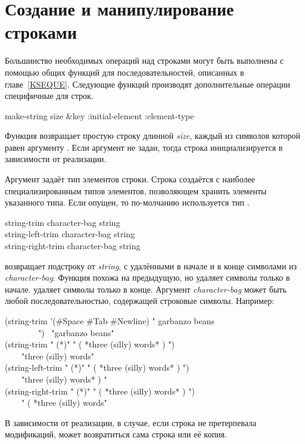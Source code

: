 \section{Создание и манипулирование строками}

Большинство необходимых операций над строками могут быть выполнены с помощью
общих функций для последовательностей, описанных в главе~\ref{KSEQUE}.
Следующие функций производят дополнительные операции специфичные для строк.

\begin{defun}[Функция]
make-string size &key :initial-element :element-type

Функция возвращает простую строку длинной \emph{size}, каждый из символов
которой равен аргументу .
Если аргумент  не задан, тогда строка инициализируется в
зависимости от реализации.

Аргумент  задаёт тип элементов строки. 
Строка создаётся с наиболее специализированным типов элементов, позволяющем
хранить элементы указанного типа.
Если  опущен, то по-молчанию используется тип .
\end{defun}

\begin{defun}[Функция]
string-trim character-bag string \\
string-left-trim character-bag string \\
string-right-trim character-bag string

 возвращает подстроку от \emph{string}, с удалёнными в начале и
в конце символами из \emph{character-bag}.
Функция  похожа на предыдущую, но удаляет символы только в
начале.
 удаляет символы только в
конце.
Аргумент \emph{character-bag} может быть любой последовательностью, содержащей
строковые символы.
Например:
\begin{lisp}
(string-trim '(\#{\Xbackslash}Space \#{\Xbackslash}Tab \#{\Xbackslash}Newline) " garbanzo beans \\
~~~~~~~~") \EV\ "garbanzo beans" \\
(string-trim " (*)" " ( *three (silly) words* ) ") \\
~~~\EV\ "three (silly) words" \\
(string-left-trim " (*)" " ( *three (silly) words* ) ") \\
~~~\EV\ "three (silly) words* ) " \\
(string-right-trim " (*)" " ( *three (silly) words* ) ") \\
~~~\EV\ " ( *three (silly) words"
\end{lisp}
В зависимости от реализации, в случае, если строка не претерпевала модификаций,
может возвратиться сама строка или её копия.
\end{defun}

